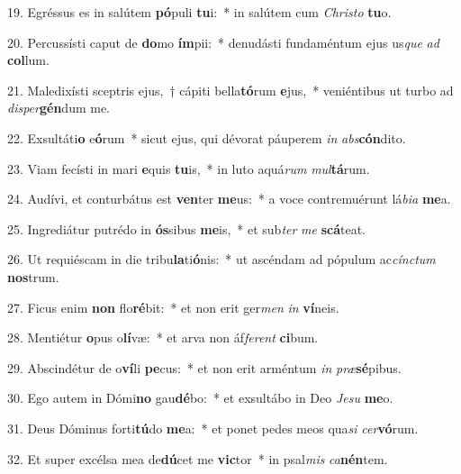 19. Egréssus es in salútem \textbf{pó}puli \textbf{tu}i:~* in salútem cum \textit{Chris}\textit{to} \textbf{tu}o.

20. Percussísti caput de \textbf{do}mo \textbf{ím}pii:~* denudásti fundaméntum ejus us\textit{que} \textit{ad} \textbf{col}lum.

21. Maledixísti sceptris ejus,~† cápiti bella\textbf{tó}rum \textbf{e}jus,~* veniéntibus ut turbo ad \textit{di}\textit{sper}\textbf{gén}dum me.

22. Exsultáti\textbf{o} e\textbf{ó}rum~* sicut ejus, qui dévorat páuperem \textit{in} \textit{abs}\textbf{cón}dito.

23. Viam fecísti in mari \textbf{e}quis \textbf{tu}is,~* in luto aquá\textit{rum} \textit{mul}\textbf{tá}rum.

24. Audívi, et conturbátus est \textbf{ven}ter \textbf{me}us:~* a voce contremuérunt lá\textit{bi}\textit{a} \textbf{me}a.

25. Ingrediátur putrédo in \textbf{ós}sibus \textbf{me}is,~* et sub\textit{ter} \textit{me} \textbf{scá}teat.

26. Ut requiéscam in die tribu\textbf{la}ti\textbf{ó}nis:~* ut ascéndam ad pópulum ac\textit{cínc}\textit{tum} \textbf{nos}trum.

27. Ficus enim \textbf{non} flo\textbf{ré}bit:~* et non erit ger\textit{men} \textit{in} \textbf{ví}neis.

28. Mentiétur \textbf{o}pus o\textbf{lí}væ:~* et arva non áf\textit{fe}\textit{rent} \textbf{ci}bum.

29. Abscindétur de o\textbf{ví}li \textbf{pe}cus:~* et non erit arméntum \textit{in} \textit{præ}\textbf{sé}pibus.

30. Ego autem in Dómi\textbf{no} gau\textbf{dé}bo:~* et exsultábo in Deo \textit{Je}\textit{su} \textbf{me}o.

31. Deus Dóminus forti\textbf{tú}do \textbf{me}a:~* et ponet pedes meos qua\textit{si} \textit{cer}\textbf{vó}rum.

32. Et super excélsa mea de\textbf{dú}cet me \textbf{vic}tor~* in psal\textit{mis} \textit{ca}\textbf{nén}tem.
